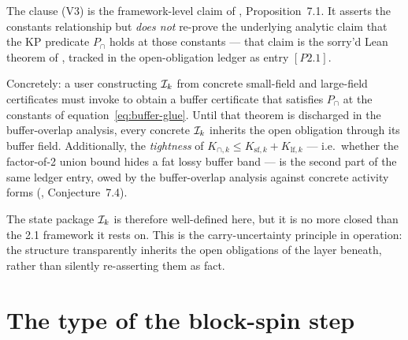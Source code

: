 \begin{remark}
\label{rem:carry-uncertainty}
The clause (V3) is the framework-level claim of , Proposition~7.1.  It asserts the constants relationship but \emph{does not} re-prove the underlying analytic claim that the KP predicate $P_{\cap}$ holds at those constants --- that claim is the sorry'd Lean theorem  of , tracked in the open-obligation ledger as entry $[P2.1]$.

Concretely: a user constructing $\Ical_k$ from concrete small-field and large-field certificates must invoke  to obtain a buffer certificate that satisfies $P_{\cap}$ at the constants of equation~\eqref{eq:buffer-glue}.  Until that theorem is discharged in the buffer-overlap analysis, every concrete $\Ical_k$ inherits the open obligation through its buffer field.  Additionally, the \emph{tightness} of $K_{\cap, k} \le K_{\mathrm{sf}, k} + K_{\mathrm{lf}, k}$ --- i.e.\ whether the factor-of-2 union bound hides a fat lossy buffer band --- is the second part of the same ledger entry, owed by the buffer-overlap analysis against concrete activity forms (, Conjecture~7.4).

The state package $\Ical_k$ is therefore well-defined here, but it is no more closed than the 2.1 framework it rests on.  This is the carry-uncertainty principle in operation: the structure transparently inherits the open obligations of the layer beneath, rather than silently re-asserting them as fact.
\end{remark}

\begin{mainfigure}
\centering

\caption{The inductive state $\Ical_k$ as a labeled tuple of its
seven components ($k$, $\sigh_k$, $g_k$, $c^{\mathrm{sf}}_k$,
$c^{\mathrm{lf}}_k$, $c^\cap_k$, $\Pcal_k$), annotated with the
scale-$k$-local validity hypotheses (V1)--(V3).  The step arrow
$\Ical_k \to \Ical_{k+1}$ represents the block-spin pushforward of
the next section, whose type-level constraints are not yet
discharged here.  The polymer atlas $\Pcal_k$ is now closed in
the concrete \texttt{CanonicalPolyAtlas} variant (previously open
in the project's design).}
\label{fig:inductive-state-tuple}
\end{mainfigure}

\section{The type of the block-spin step}
\label{sec:step}

